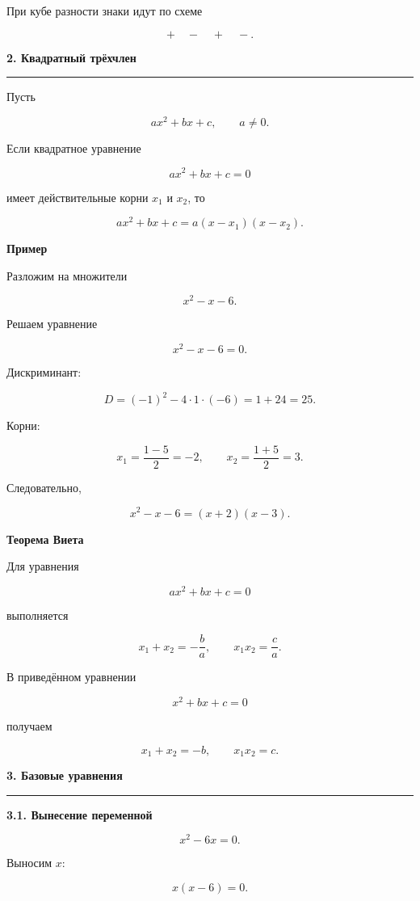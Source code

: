 \documentclass[a4paper,12pt]{article}
\newcommand{\MainSection}[1]{%
  \vspace{0.7em}
  {\Large\bfseries\color{darkaccent}#1\par}
  \vspace{0.25em}
  {\color{accent}\rule{\linewidth}{0.6pt}}
  \vspace{0.5em}
}
\newcommand{\SubSection}[1]{%
  \vspace{0.5em}
  {\large\bfseries\color{accent}#1\par}
  \vspace{0.2em}
}
\begin{document}
При кубе разности знаки идут по схеме

\[
+\quad -\quad +\quad -.
\]


\MainSection{2. Квадратный трёхчлен}

Пусть

\[
ax^2+bx+c,
\qquad a\ne 0.
\]

Если квадратное уравнение

\[
ax^2+bx+c=0
\]

имеет действительные корни \(x_1\) и \(x_2\), то

\[
ax^2+bx+c
=
a(x-x_1)(x-x_2).
\]

\SubSection{Пример}

Разложим на множители

\[
x^2-x-6.
\]

Решаем уравнение

\[
x^2-x-6=0.
\]

Дискриминант:

\[
D=(-1)^2-4\cdot1\cdot(-6)=1+24=25.
\]

Корни:

\[
x_1=\frac{1-5}{2}=-2,
\qquad
x_2=\frac{1+5}{2}=3.
\]

Следовательно,

\[
x^2-x-6
=
(x+2)(x-3).
\]

\SubSection{Теорема Виета}

Для уравнения

\[
ax^2+bx+c=0
\]

выполняется

\[
x_1+x_2=-\frac ba,
\qquad
x_1x_2=\frac ca.
\]

В приведённом уравнении

\[
x^2+bx+c=0
\]

получаем

\[
x_1+x_2=-b,
\qquad
x_1x_2=c.
\]


\MainSection{3. Базовые уравнения}

\SubSection{3.1. Вынесение переменной}

\[
x^2-6x=0.
\]

Выносим \(x\):

\[
x(x-6)=0.
\]
\end{document}
